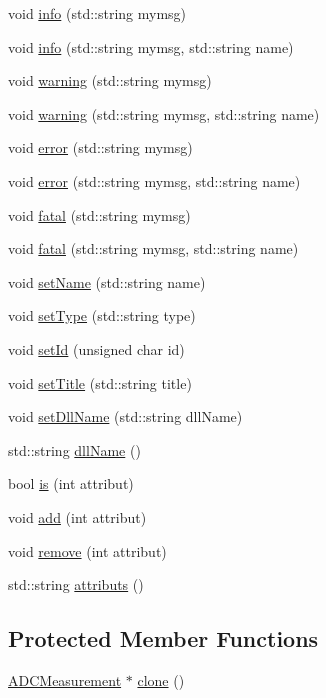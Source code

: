 \begin{DoxyCompactItemize}
\item 
void \hyperlink{classObject_a644fd329ea4cb85f54fa6846484b84a8}{info} (std::string mymsg)
\item 
void \hyperlink{classObject_a1ca123253dfd30fc28b156f521dcbdae}{info} (std::string mymsg, std::string name)
\item 
void \hyperlink{classObject_a65cd4fda577711660821fd2cd5a3b4c9}{warning} (std::string mymsg)
\item 
void \hyperlink{classObject_a11f101db4dd73d9391b0231818881d86}{warning} (std::string mymsg, std::string name)
\item 
void \hyperlink{classObject_a204a95f57818c0f811933917a30eff45}{error} (std::string mymsg)
\item 
void \hyperlink{classObject_ad7f6c457733082efa2f9ff5f5c8e119a}{error} (std::string mymsg, std::string name)
\item 
void \hyperlink{classObject_aad5a16aac7516ce65bd5ec02ab07fc80}{fatal} (std::string mymsg)
\item 
void \hyperlink{classObject_ae62acd3d09f716220f75f252dc38bc9a}{fatal} (std::string mymsg, std::string name)
\item 
void \hyperlink{classObject_ae30fea75683c2d149b6b6d17c09ecd0c}{setName} (std::string name)
\item 
void \hyperlink{classObject_aae534cc9d982bcb9b99fd505f2e103a5}{setType} (std::string type)
\item 
void \hyperlink{classObject_a398fe08cba594a0ce6891d59fe4f159f}{setId} (unsigned char id)
\item 
void \hyperlink{classObject_a89557dbbad5bcaa02652f5d7fa35d20f}{setTitle} (std::string title)
\item 
void \hyperlink{classObject_a870c5af919958c2136623b2d7816d123}{setDllName} (std::string dllName)
\item 
std::string \hyperlink{classObject_a2e3947f2870094c332d7454117f3ec63}{dllName} ()
\item 
bool \hyperlink{classAttrib_a704f26af560909ad22065083bb7d4c34}{is} (int attribut)
\item 
void \hyperlink{classAttrib_a235f773af19c900264a190b00a3b4ad7}{add} (int attribut)
\item 
void \hyperlink{classAttrib_a7d4ef7e32d93cb287792b87b857e79f3}{remove} (int attribut)
\item 
std::string \hyperlink{classAttrib_aee7bbf16b144887f196e1341b24f8a26}{attributs} ()
\end{DoxyCompactItemize}
\subsection*{Protected Member Functions}
\begin{DoxyCompactItemize}
\item 
\hyperlink{classADCMeasurement}{ADCMeasurement} $\ast$ \hyperlink{classADCMeasurement_a6e34c2b4e3451f1fd128d213723ab1b9}{clone} ()
\end{DoxyCompactItemize}
